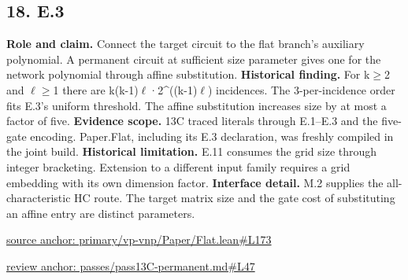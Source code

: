 \documentclass[11pt,letterpaper]{article}
\theoremstyle{definition}\newtheorem{definition}[theorem]{Definition}\newtheorem{example}[theorem]{Example}
\theoremstyle{remark}\newtheorem{remark}[theorem]{Remark}
\begin{document}
\subsection*{18. E.3}
\textbf{Role and claim.} Connect the target circuit to the flat branch's auxiliary polynomial. A permanent circuit at sufficient size parameter gives one for the network polynomial through affine substitution.
\textbf{Historical finding.} For k\ensuremath{\ge}2 and \ensuremath{\ell}\ensuremath{\ge}1 there are k(k-1)\ensuremath{\ell}·2\textasciicircum{}((k-1)\ensuremath{\ell}) incidences. The 3-per-incidence order fits E.3's uniform threshold. The affine substitution increases size by at most a factor of five.
\textbf{Evidence scope.} 13C traced literals through E.1–E.3 and the five-gate encoding. Paper.Flat, including its E.3 declaration, was freshly compiled in the joint build.
\textbf{Historical limitation.} E.11 consumes the grid size through integer bracketing. Extension to a different input family requires a grid embedding with its own dimension factor.
\textbf{Interface detail.} M.2 supplies the all-characteristic HC route. The target matrix size and the gate cost of substituting an affine entry are distinct parameters.
\par\href{https://github.com/nousentllc/VP-VNP-Review/blob/8a7976933b6b2b4ffda1ad3a0dfb5fc6b6f023e8/primary/vp-vnp/Paper/Flat.lean\#L173}{source anchor: primary/vp-vnp/Paper/Flat.lean\#L173}
\par\href{https://github.com/nousentllc/VP-VNP-Review/blob/8a7976933b6b2b4ffda1ad3a0dfb5fc6b6f023e8/passes/pass13C-permanent.md\#L47}{review anchor: passes/pass13C-permanent.md\#L47}
\goodbreak
{}
\hypertarget{claim.19}{}
\end{document}
